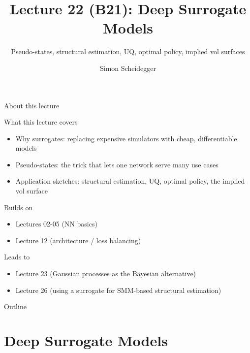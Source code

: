 \documentclass[aspectratio=169,11pt]{beamer}
\title[Lecture 22 (B21)]{Lecture 22 (B21): Deep Surrogate Models}
\subtitle{Pseudo-states, structural estimation, UQ, optimal policy, implied vol surfaces}
\author{Simon Scheidegger}
\institute{HEC, University of Lausanne}
\date{}
\begin{document}
\providecommand{\exercisepause}{%
  \tikz[baseline=(X.base)]{\node[fill=darkgreen!80!black, text=white,
  rounded corners=2pt, inner sep=3pt, font=\scriptsize\bfseries](X){PAUSE};}}

{
\begin{frame}
\titlepage
\end{frame}
}

\begin{frame}{About this lecture}
\small
\begin{block}{What this lecture covers}
\begin{itemize}\itemsep2pt
  \item Why surrogates: replacing expensive simulators with cheap, differentiable models
  \item Pseudo-states: the trick that lets one network serve many use cases
  \item Application sketches: structural estimation, UQ, optimal policy, the implied vol surface
\end{itemize}
\end{block}
\begin{block}{Builds on}
\begin{itemize}\itemsep2pt
  \item Lectures 02-05 (NN basics)
  \item Lecture 12 (architecture / loss balancing)
\end{itemize}
\end{block}
\begin{block}{Leads to}
\begin{itemize}\itemsep2pt
  \item Lecture 23 (Gaussian processes as the Bayesian alternative)
  \item Lecture 26 (using a surrogate for SMM-based structural estimation)
\end{itemize}
\end{block}
\end{frame}

\begin{frame}{Outline}
\tableofcontents
\end{frame}

\section{Deep Surrogate Models}
\end{document}
